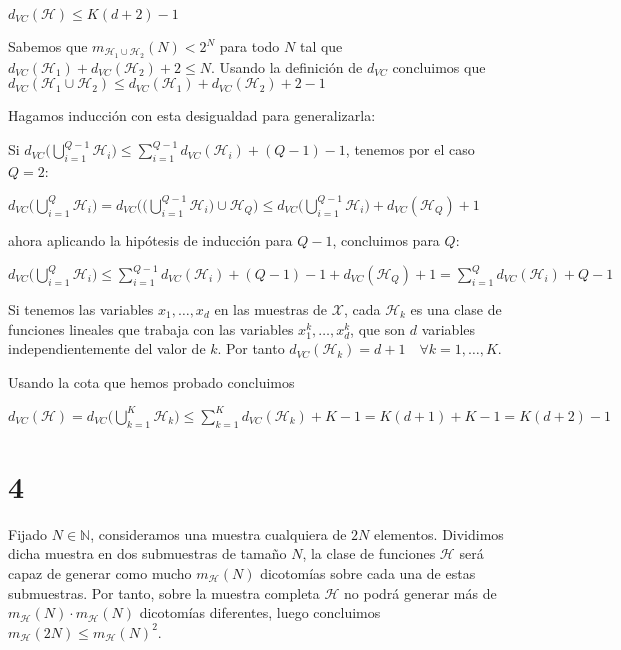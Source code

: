 \documentclass{article}
\begin{document}
\(d_{VC}(\mathcal{H})\leq K(d+2)-1\)

Sabemos que \(m_{\mathcal{H}_1\cup\mathcal{H}_2}(N)<2^N\) para todo \(N\)
tal que \(d_{VC}(\mathcal{H}_1)+d_{VC}(\mathcal{H}_2)+2\leq N\).
Usando la definición de \(d_{VC}\) concluimos que \(d_{VC}(\mathcal{H}_1\cup\mathcal{H}_2)\leq d_{VC}(\mathcal{H}_1)+d_{VC}(\mathcal{H}_2)+2-1\)

Hagamos inducción con esta desigualdad para generalizarla:

Si \(d_{VC}\bigg(\bigcup\limits_{i=1}^{Q-1}\mathcal{H}_i\bigg)\leq \sum\limits_{i=1}^{Q-1}d_{VC}(\mathcal{H}_i)+(Q-1)-1\), tenemos por el caso \(Q=2\):

\(d_{VC}\bigg(\bigcup\limits_{i=1}^Q\mathcal{H}_i\bigg) = d_{VC}\bigg(\Big(\bigcup\limits_{i=1}^{Q-1}\mathcal{H}_i\Big)\cup \mathcal{H}_Q\bigg) \leq d_{VC}\bigg(\bigcup\limits_{i=1}^{Q-1}\mathcal{H}_i\bigg) + d_{VC}(\mathcal{H}_Q) +1\)

ahora aplicando la hipótesis de inducción para \(Q-1\), concluimos para \(Q\):

\(d_{VC}\bigg(\bigcup\limits_{i=1}^Q\mathcal{H}_i\bigg) \leq \sum\limits_{i=1}^{Q-1}d_{VC}(\mathcal{H}_i)+(Q-1)-1+d_{VC}(\mathcal{H}_Q) +1 = \sum\limits_{i=1}^Qd_{VC}(\mathcal{H}_i)+Q-1\)


Si tenemos las variables \(x_1,\ldots,x_d\) en las muestras de
\(\mathcal{X}\), cada \(\mathcal{H}_k\) es una clase de funciones
lineales que trabaja con las variables \(x_1^k,\ldots,x_d^k\), que son
\(d\) variables independientemente del valor de \(k\). Por tanto
\(d_{VC}(\mathcal{H}_k)=d+1\quad\forall k=1,\ldots,K\).

Usando la cota que hemos probado concluimos

\(d_{VC}(\mathcal{H})=d_{VC}\bigg(\bigcup\limits_{k=1}^K\mathcal{H}_k\bigg)\leq \sum\limits_{k=1}^Kd_{VC}(\mathcal{H}_k) +K-1 = K(d+1)+K-1=K(d+2)-1 \)

\section{4}

Fijado \(N\in\mathbb{N}\), consideramos una muestra cualquiera de
\(2N\) elementos. Dividimos dicha muestra en dos submuestras de tamaño
\(N\), la clase de funciones \(\mathcal{H}\) será capaz de generar
como mucho \(m_{\mathcal{H}}(N)\) dicotomías sobre cada una de estas
submuestras. Por tanto, sobre la muestra completa \(\mathcal{H}\) no
podrá generar más de \(m_{\mathcal{H}}(N)\cdot m_{\mathcal{H}}(N)\)
dicotomías diferentes, luego concluimos
\(m_{\mathcal{H}}(2N)\leq m_{\mathcal{H}}(N)^2\).
\end{document}
